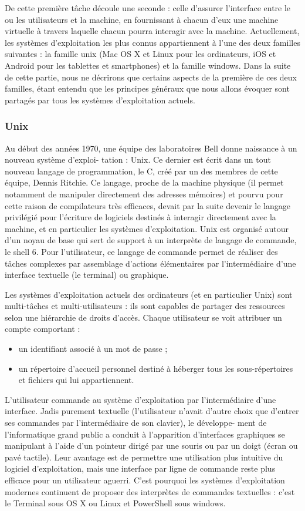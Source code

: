 De cette première tâche découle une seconde : celle d’assurer l’interface entre le ou les utilisateurs et la machine,
en fournissant à chacun d’eux une machine virtuelle à travers laquelle chacun pourra interagir avec la machine.
Actuellement, les systèmes d’exploitation les plus connus appartiennent à l’une des deux familles suivantes : la
famille unix (Mac OS X et Linux pour les ordinateurs, iOS et Android pour les tablettes et smartphones) et la
famille windows. Dans la suite de cette partie, nous ne décrirons que certains aspects de la première de ces
deux familles, étant entendu que les principes généraux que nous allons évoquer sont partagés par tous les
systèmes d’exploitation actuels.
\subsubsection{Unix}
Au début des années 1970, une équipe des laboratoires Bell donne naissance à un nouveau système d’exploi-
tation : Unix. Ce dernier est écrit dans un tout nouveau langage de programmation, le C, créé par un des
membres de cette équipe, Dennis Ritchie. Ce langage, proche de la machine physique (il permet notamment
de manipuler directement des adresses mémoires) et pourvu pour cette raison de compilateurs très efficaces,
devait par la suite devenir le langage privilégié pour l’écriture de logiciels destinés à interagir directement avec
la machine, et en particulier les systèmes d’exploitation.
Unix est organisé autour d’un noyau de base qui sert de support à un interprète de langage de commande, le
shell 6. Pour l’utilisateur, ce langage de commande permet de réaliser des tâches complexes par assemblage
d’actions élémentaires par l’intermédiaire d’une interface textuelle (le terminal) ou graphique.

Les systèmes d’exploitation actuels des ordinateurs (et en particulier Unix) sont multi-tâches et multi-utilisateurs :
ils sont capables de partager des ressources selon une hiérarchie de droits d’accès. Chaque utilisateur se voit
attribuer un compte comportant :
\begin{itemize}
    \item un identifiant associé à un mot de passe ;
    \item un répertoire d’accueil personnel destiné à héberger tous les sous-répertoires et fichiers qui lui appartiennent.
\end{itemize}


L’utilisateur commande au système d’exploitation par l’intermédiaire d’une interface. Jadis purement textuelle
(l’utilisateur n’avait d’autre choix que d’entrer ses commandes par l’intermédiaire de son clavier), le développe-
ment de l’informatique grand public a conduit à l’apparition d’interfaces graphiques se manipulant à l’aide
d’un pointeur dirigé par une souris ou par un doigt (écran ou pavé tactile). Leur avantage est de permettre une
utilisation plus intuitive du logiciel d’exploitation, mais une interface par ligne de commande reste plus efficace
pour un utilisateur aguerri. C’est pourquoi les systèmes d’exploitation modernes continuent de proposer des
interprètes de commandes textuelles : c’est le Terminal sous OS X ou Linux et PowerShell sous windows.
